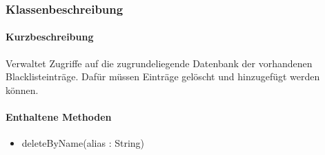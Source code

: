 \subsubsection*{Klassenbeschreibung}%
\paragraph*{Kurzbeschreibung}
Verwaltet Zugriffe auf die zugrundeliegende Datenbank der vorhandenen Blacklisteinträge.
Dafür müssen Einträge gelöscht und hinzugefügt werden können.
\paragraph*{Enthaltene Methoden}
\begin{itemize}
    \item deleteByName(alias : String)
\end{itemize}
